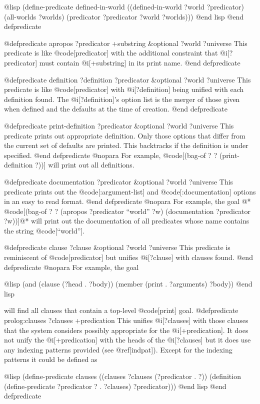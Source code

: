 {@lisp
(define-predicate defined-in-world
  ((defined-in-world ?world ?predicator)
   (all-worlds ?worlds)
   (predicator ?predicator ?world ?worlds)))
@end lisp
@end defpredicate

@defpredicate apropos ?predicator +substring &optional ?world ?universe
This predicate is like @code[predicator] with the additional constraint
that @i[?predicator] must contain @i[+substring] in its print name.
@end defpredicate

@defpredicate definition ?definition ?predicator &optional ?world ?universe
This predicate is like @code[predicator] with @i[?definition] being unified
with each definition found.
The @i[?definition]'s option list is the merger of those given when defined
and the defaults at the time of creation.
@end defpredicate

@defpredicate print-definition ?predicator &optional ?world ?universe
This predicate prints out appropriate definition. Only those options
that differ from the current set of defaults are printed.
This backtracks if the definition is under specified.
@end defpredicate
@nopara
For example, @code[(bag-of ? ? (print-definition ?))] will print out all
definitions.

@defpredicate documentation ?predicator &optional ?world ?universe
This predicate prints out the @code[:argument-list] and @code[:documentation]
options in an easy to read format.
@end defpredicate
@nopara
For example, the goal @*
@code[(bag-of ? ? (apropos ?predicator ``world'' ?w) (documentation ?predicator ?w))]@*
will print out the documentation of all predicates whose name contains the
string @code[``world''].

@defpredicate clause ?clause &optional ?world ?universe
This predicate is reminiscent of @code[predicator] but unifies @i[?clause]
with clauses found.
@end defpredicate
@nopara
For example, the goal

@lisp
(and (clause (?head . ?body))
     (member (print . ?arguments) ?body))
@end lisp

will find all clauses that contain a top-level @code[print] goal.
@defpredicate prolog:clauses ?clauses +predication
This unifies @i[?clauses] with those clauses that the system considers
possibly appropriate for the @i[+predication].
It does not unify the @i[+predication] with the heads of the @i[?clauses]
but it does use any indexing patterns provided (see @ref[indpat]).
Except for the indexing patterns it could be defined as

@lisp
(define-predicate clauses
  ((clauses ?clauses (?predicator . ?))
   (definition (define-predicate ?predicator ? . ?clauses)
               ?predicator)))
@end lisp
@end defpredicate

}
